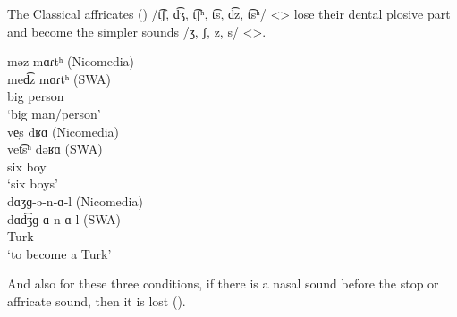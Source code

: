 
The Classical affricates () /t͡ʃ, d͡ʒ, t͡ʃʰ, t͡s, d͡z, t͡sʰ/ <> lose their dental plosive part and become the simpler sounds /ʒ, ʃ, z, s/ <>. 


\begin{exe}
	\ex \label{sent:Nicomedia:phonology:change:cons:affr}
	\begin{xlist}
		\ex \glll məz mɑɾtʰ (Nicomedia) \\
		med͡z mɑɾtʰ (SWA) \\
		big person\\
		\trans `big man/person'\\
		\ex \glll ve̞s dʁɑ (Nicomedia) \\
		vet͡sʰ dəʁɑ (SWA) \\
		six boy\\
		\trans `six boys' \\
		\ex \glll dɑʒɡ-ə-n-ɑ-l (Nicomedia) \\
		dɑd͡ʒɡ-ɑ-n-ɑ-l (SWA) \\
		Turk-{\lvgloss}-{\inch}-{\thgloss}-{\infgloss}\\
		\trans `to become a Turk' \\
		
	\end{xlist}
\end{exe}



And also for these three conditions, if there is a nasal sound before the stop or affricate sound, then it is lost (). 

